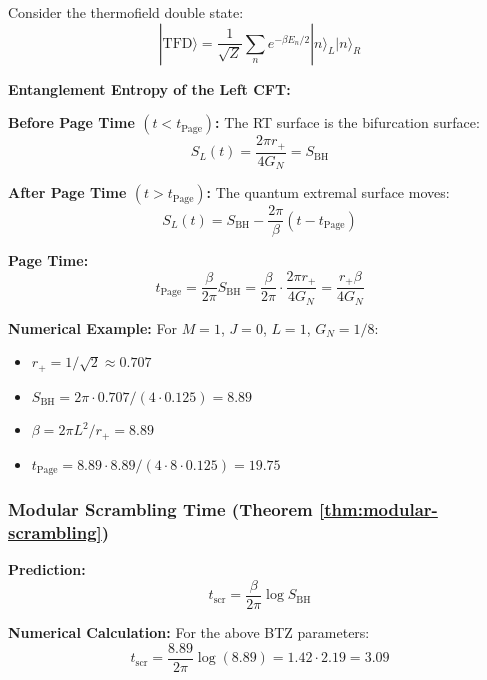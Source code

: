 \documentclass[12pt,a4paper]{article}
\begin{document}
Consider the thermofield double state:
\begin{equation}
|\text{TFD}\rangle = \frac{1}{\sqrt{Z}} \sum_n e^{-\beta E_n/2} |n\rangle_L |n\rangle_R
\end{equation}

\textbf{Entanglement Entropy of the Left CFT:}

\textbf{Before Page Time $(t < t_{\text{Page}})$:}
The RT surface is the bifurcation surface:
\begin{equation}
S_L(t) = \frac{2\pi r_+}{4G_N} = S_{\text{BH}}
\end{equation}

\textbf{After Page Time $(t > t_{\text{Page}})$:}
The quantum extremal surface moves:
\begin{equation}
S_L(t) = S_{\text{BH}} - \frac{2\pi}{\beta}(t - t_{\text{Page}})
\end{equation}

\textbf{Page Time:}
\begin{equation}
t_{\text{Page}} = \frac{\beta}{2\pi} S_{\text{BH}} = \frac{\beta}{2\pi} \cdot \frac{2\pi r_+}{4G_N} = \frac{r_+ \beta}{4G_N}
\end{equation}

\textbf{Numerical Example:}
For $M = 1$, $J = 0$, $L = 1$, $G_N = 1/8$:
\begin{itemize}
    \item $r_+ = 1/\sqrt{2} \approx 0.707$
    \item $S_{\text{BH}} = 2\pi \cdot 0.707 / (4 \cdot 0.125) = 8.89$
    \item $\beta = 2\pi L^2/r_+ = 8.89$
    \item $t_{\text{Page}} = 8.89 \cdot 8.89 / (4 \cdot 8 \cdot 0.125) = 19.75$
\end{itemize}

\subsubsection{Modular Scrambling Time (Theorem \ref{thm:modular-scrambling})}

\textbf{Prediction:}
\begin{equation}
t_{\text{scr}} = \frac{\beta}{2\pi} \log S_{\text{BH}}
\end{equation}

\textbf{Numerical Calculation:}
For the above BTZ parameters:
\begin{equation}
t_{\text{scr}} = \frac{8.89}{2\pi} \log(8.89) = 1.42 \cdot 2.19 = 3.09
\end{equation}
\end{document}
